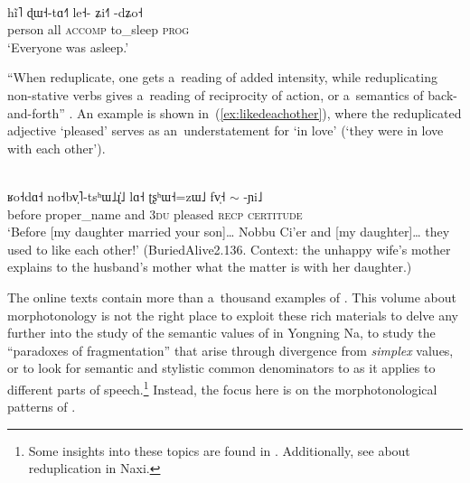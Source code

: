 \begin{exe}
	\ex
	\label{ex:everyoneasleepprog}
	\\
	\gll hĩ˥		ɖɯ˧-tɑ˧˥	le˧-			ʑi˧˥	-dʑo˧\\
	person		all		\textsc{accomp}		to\_sleep	\textsc{prog}\\
	\glt ‘Everyone was asleep.’
\end{exe}

“When  reduplicate, one gets a~reading of added intensity, while
reduplicating non-{stative} verbs gives a~reading of reciprocity of action, or a~semantics of
back-and-forth” \citep[373]{lidz2010}. An example is shown in~(\ref{ex:likedeachother}), where the reduplicated adjective ‘pleased’ serves as an~understatement for ‘in love’ (‘they were in love with each other’).

\begin{exe}
	\ex
	\label{ex:likedeachother}
	\\
	\gll ʁo˧dɑ˧		no˧bv̩˥-tsʰɯ˩ɻ̍˩	lɑ˧	ʈʂʰɯ˧=zɯ˩		fv̩˧	{$\sim$} -ɲi˩\\
	before		proper\_name	and		\textsc{3du}	pleased		\textsc{recp}		\textsc{certitude}\\
	\glt ‘Before [my daughter married your son]{\dots} Nobbu Ci’er and [my daughter]{\dots} they used to like each other!’ (BuriedAlive2.136. Context: the unhappy wife's mother explains to the husband's mother what the matter is with her daughter.)
\end{exe}

The online texts contain more than a~thousand examples of . This volume about morphotonology is not the right place to exploit these rich materials to delve any further into the study of the semantic values of  in Yongning Na, to study the “paradoxes of fragmentation” \citep{francois2004} that arise through divergence from \textit{simplex} values, or to look for semantic and stylistic common denominators to  as it applies to different parts of speech.\footnote{Some insights into these topics are found in \citet[372-373, 385, 438, 440]{lidz2010}. Additionally, see \citet{michaudetal2007b} about {reduplication} in {Naxi}.} Instead, the focus here is on the morphotonological patterns of .


